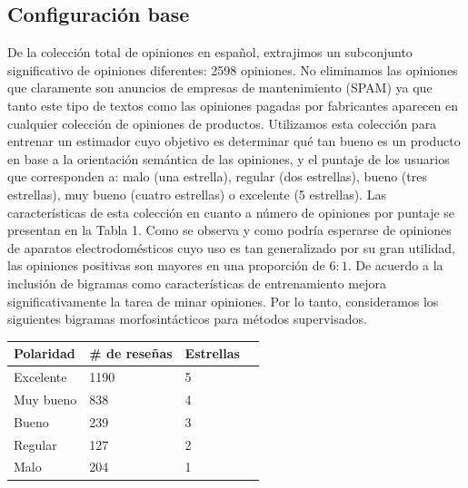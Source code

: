 \documentclass[a0,portrait]{a0poster}
\begin{document}
\begin{multicols}{2}
\subsection*{Configuración base} 

De la colección total de opiniones en español, extrajimos un subconjunto significativo de opiniones diferentes: 2598 opiniones. No eliminamos las opiniones que claramente son anuncios de empresas de mantenimiento (SPAM) ya que tanto este tipo de textos como las opiniones pagadas por fabricantes aparecen en cualquier colección de opiniones de productos. Utilizamos esta colección para entrenar un estimador cuyo objetivo es determinar qué tan bueno es un producto en base a la orientación semántica de las opiniones, y el puntaje de los usuarios que corresponden a: malo (una estrella), regular (dos estrellas), bueno (tres estrellas), muy bueno (cuatro estrellas) o excelente (5 estrellas). Las características de esta colección en cuanto a número de opiniones por puntaje se presentan en la Tabla 1. Como se observa y como podría esperarse de opiniones de aparatos electrodomésticos cuyo uso es tan generalizado por su gran utilidad, las opiniones positivas son mayores en una proporción de $6 : 1$. De acuerdo a \cite{wang2012baselines} la inclusión de bigramas como características de entrenamiento mejora significativamente la tarea de minar opiniones. Por lo tanto, consideramos los siguientes bigramas morfosintácticos para métodos supervisados.

\begin{center}\vspace{1cm}
\begin{tabular}{l l l l}
\toprule
\textbf{Polaridad}&\textbf{\# de reseñas}&\textbf{Estrellas} \\
\midrule
Excelente & 1190 & 5\\
Muy bueno & 838 & 4\\
Bueno & 239 & 3\\
Regular & 127 & 2 \\
Malo & 204 & 1\\
\bottomrule
\end{tabular}
\end{center}\vspace{1cm}




\end{multicols}
\end{document}
